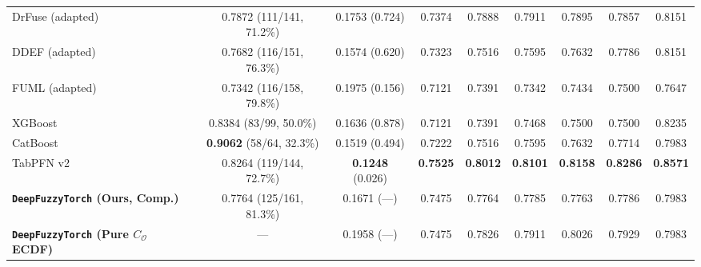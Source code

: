 \documentclass[10pt,twocolumn]{article}
\begin{document}
\begin{table}[t]
{\begin{tabular}{@{}lcccccccc@{}}
DrFuse (adapted) \cite{yao2024drfuse} & 0.7872 (111/141, 71.2\%) & 0.1753 (0.724) &
0.7374 & 0.7888 & 0.7911 & 0.7895 & 0.7857 & 0.8151 \\
DDEF (adapted) \cite{shao2024dual} & 0.7682 (116/151, 76.3\%) & 0.1574 (0.620) &
0.7323 & 0.7516 & 0.7595 & 0.7632 & 0.7786 & 0.8151 \\
FUML (adapted) \cite{duan2025fuml} & 0.7342 (116/158, 79.8\%) & 0.1975 (0.156) &
0.7121 & 0.7391 & 0.7342 & 0.7434 & 0.7500 & 0.7647 \\
XGBoost \cite{chen2016xgboost} & 0.8384 (83/99, 50.0\%) & 0.1636 (0.878) &
0.7121 & 0.7391 & 0.7468 & 0.7500 & 0.7500 & 0.8235 \\
CatBoost \cite{prokhorenkova2018catboost} & \textbf{0.9062} (58/64, 32.3\%) & 0.1519 (0.494) &
0.7222 & 0.7516 & 0.7595 & 0.7632 & 0.7714 & 0.7983 \\
TabPFN v2 \cite{hollmann2025tabpfn} & 0.8264 (119/144, 72.7\%) & \textbf{0.1248} (0.026) &
\textbf{0.7525} & \textbf{0.8012} & \textbf{0.8101} & \textbf{0.8158} & \textbf{0.8286} &
\textbf{0.8571} \\
\midrule
\textbf{\texttt{DeepFuzzyTorch} (Ours, Comp.)} & 0.7764 (125/161, 81.3\%) & 0.1671 (---) &
0.7475 & 0.7764 & 0.7785 & 0.7763 & 0.7786 & 0.7983 \\
\textbf{\texttt{DeepFuzzyTorch} (Pure $C_{\mathcal{O}}$ ECDF)} & --- & 0.1958 (---) &
0.7475 & 0.7826 & 0.7911 & 0.8026 & 0.7929 & 0.7983 \\
\bottomrule
\end{tabular}%
}
\end{table}
\end{document}
